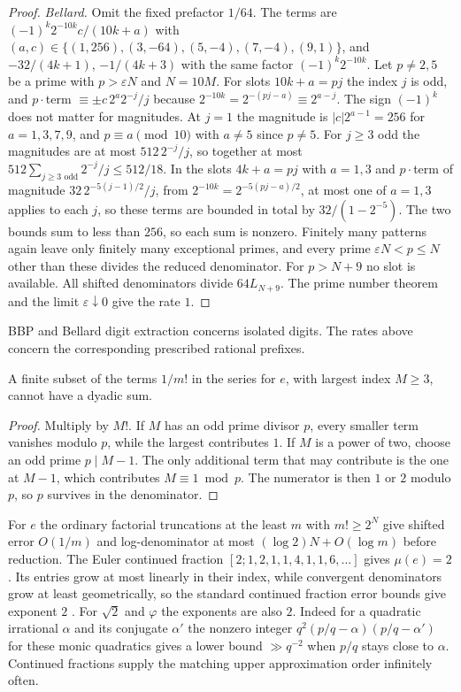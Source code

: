 \documentclass[11pt]{article}
\begin{document}
\begin{proof}
\emph{Bellard.} Omit the fixed prefactor $1/64$. The terms are $(-1)^k2^{-10k}c/(10k+a)$ with $(a,c)\in\{(1,256),(3,-64),(5,-4),(7,-4),(9,1)\}$, and $-32/(4k+1)$, $-1/(4k+3)$ with the same factor $(-1)^k2^{-10k}$. Let $p\ne2,5$ be a prime with $p>\varepsilon N$ and $N=10M$. For slots $10k+a=pj$ the index $j$ is odd, and $p\cdot$term $\equiv\pm c\,2^{a}2^{-j}/j$ because $2^{-10k}=2^{-(pj-a)}\equiv2^{a-j}$. The sign $(-1)^k$ does not matter for magnitudes. At $j=1$ the magnitude is $|c|2^{a-1}=256$ for $a=1,3,7,9$, and $p\equiv a\pmod{10}$ with $a\ne5$ since $p\ne5$. For $j\ge3$ odd the magnitudes are at most $512\,2^{-j}/j$, so together at most $512\sum_{j\ge3\text{ odd}}2^{-j}/j\le512/18$. In the slots $4k+a=pj$ with $a=1,3$ and $p\cdot$term of magnitude $32\,2^{-5(j-1)/2}/j$, from $2^{-10k}=2^{-5(pj-a)/2}$, at most one of $a=1,3$ applies to each $j$, so these terms are bounded in total by $32/(1-2^{-5})$. The two bounds sum to less than $256$, so each sum is nonzero. Finitely many patterns again leave only finitely many exceptional primes, and every prime $\varepsilon N<p\le N$ other than these divides the reduced denominator. For $p>N+9$ no slot is available. All shifted denominators divide $64L_{N+9}$. The prime number theorem and the limit $\varepsilon\downarrow0$ give the rate $1$.
\end{proof}


BBP and Bellard digit extraction concerns isolated digits. The rates above concern the corresponding prescribed rational prefixes.

\begin{proposition}\label{prop:factorial}
A finite subset of the terms $1/m!$ in the series for $e$, with largest index $M\ge3$, cannot have a dyadic sum.
\end{proposition}
\begin{proof}
Multiply by $M!$. If $M$ has an odd prime divisor $p$, every smaller term vanishes modulo $p$, while the largest contributes $1$. If $M$ is a power of two, choose an odd prime $p\mid M-1$. The only additional term that may contribute is the one at $M-1$, which contributes $M\equiv1\bmod p$. The numerator is then $1$ or $2$ modulo $p$, so $p$ survives in the denominator.
\end{proof}

For $e$ the ordinary factorial truncations at the least $m$ with $m!\ge2^N$ give shifted error $O(1/m)$ and log-denominator at most $(\log2)N+O(\log m)$ before reduction. The Euler continued fraction $[2;1,2,1,1,4,1,1,6,\ldots]$ gives $\mu(e)=2$. Its entries grow at most linearly in their index, while convergent denominators grow at least geometrically, so the standard continued fraction error bounds give exponent $2$ \cite{euler}. For $\sqrt2$ and $\varphi$ the exponents are also $2$. Indeed for a quadratic irrational $\alpha$ and its conjugate $\alpha'$ the nonzero integer $q^2(p/q-\alpha)(p/q-\alpha')$ for these monic quadratics gives a lower bound $\gg q^{-2}$ when $p/q$ stays close to $\alpha$. Continued fractions supply the matching upper approximation order infinitely often.
\end{document}

